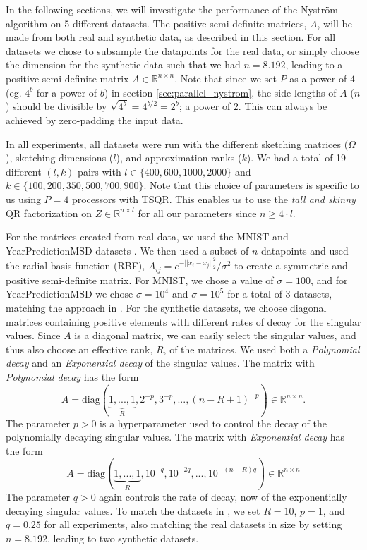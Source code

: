 \documentclass{article}
\theoremstyle{definition}
\begin{document}
In the following sections, we will investigate the performance of the Nyström algorithm on 5 different datasets. The positive semi-definite matrices, $A$, will be made from both real and synthetic data, as described in this section. For all datasets we chose to subsample the datapoints for the real data, or simply choose the dimension for the synthetic data such that we had $n=8.192$, leading to a positive semi-definite matrix $A\in\mathbb{R}^{n\times n}$. Note that since we set $P$ as a power of $4$ (eg. $4^b$ for a power of $b$) in section \ref{sec:parallel_nystrom}, the side lengths of $A$ ($n$) should be divisible by $\sqrt{4^b}=4^{b/2}=2^b$; a power of $2$. This can always be achieved by zero-padding the input data. \newline

In all experiments, all datasets were run with the different sketching matrices ($\Omega$), sketching dimensions ($l$), and approximation ranks ($k$). We had a total of 19 different $(l,k)$ pairs with $l\in\{400, 600, 1000, 2000\}$ and $k\in\{100, 200, 350, 500, 700, 900\}$. Note that this choice of parameters is specific to us using $P=4$ processors with TSQR. This enables us to use the \textit{tall and skinny} QR factorization on $Z\in\mathbb{R}^{n\times l}$ for all our parameters since $n\geq 4\cdot l$.\newline

For the matrices created from real data, we used the MNIST and YearPredictionMSD datasets \cite{726791, Bertin-Mahieux2011}. We then used a subset of $n$ datapoints and used the radial basis function (RBF), $A_{ij}=e^{-||x_i-x_j||_2^2}/{\sigma^2}$ to create a symmetric and positive semi-definite matrix. For MNIST, we chose a value of $\sigma=100$, and for YearPredictionMSD we chose $\sigma=10^4$ and $\sigma=10^5$ for a total of 3 datasets, matching the approach in \cite{balabanov2022}. \newline
For the synthetic datasets, we choose diagonal matrices containing positive elements with different rates of decay for the singular values. Since $A$ is a diagonal matrix, we can easily select the singular values, and thus also choose an effective rank, $R$, of the matrices. We used both a \textit{Polynomial decay} and an \textit{Exponential decay} of the singular values. The matrix with \textit{Polynomial decay} has the form
\begin{equation*}
A=\text{diag}(\underbrace{1,...,1}_R,2^{-p}, 3^{-p}, ..., (n-R+1)^{-p})\in\mathbb{R}^{n\times n}.
\end{equation*}
The parameter $p>0$ is a hyperparameter used to control the decay of the polynomially decaying singular values. The matrix with \textit{Exponential decay} has the form
\begin{equation*}
A=\text{diag}(\underbrace{1,...,1}_R,10^{-q}, 10^{-2q}, ..., 10^{-(n-R)q})\in\mathbb{R}^{n\times n}
\end{equation*}
The parameter $q>0$ again controls the rate of decay, now of the exponentially decaying singular values. To match the datasets in \cite{tropp2017fixedrank}, we set $R=10$, $p=1$, and $q=0.25$ for all experiments, also matching the real datasets in size by setting $n=8.192$, leading to two synthetic datasets.
\end{document}
